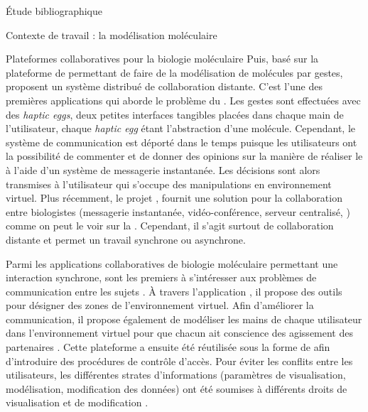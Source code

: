 \documentclass[myfrancais,ngerman,english,frenchb]{mythesis}
\begin{document}
\begin{mychapter}{Étude bibliographique}
\begin{mysection}{Contexte de travail : la modélisation moléculaire}
\begin{mysubsection}{Plateformes collaboratives pour la biologie moléculaire}
				Puis, basé sur la plateforme de  permettant de faire de la modélisation de molécules par gestes,  proposent un système distribué de collaboration distante.
				C'est l'une des premières applications qui aborde le problème du .
				Les gestes sont effectuées avec des \textit{haptic eggs}, deux petites interfaces tangibles placées dans chaque main de l'utilisateur, chaque \textit{haptic egg} étant l'abstraction d'une molécule.
				Cependant, le système de communication est déporté dans le temps puisque les utilisateurs ont la possibilité de commenter et de donner des opinions sur la manière de réaliser le  à l'aide d'un système de messagerie instantanée.
				Les décisions sont alors transmises à l'utilisateur qui s'occupe des manipulations en environnement virtuel.
				Plus récemment, le projet \myeMinerals {}, fournit une solution pour la collaboration entre biologistes (messagerie instantanée, vidéo-conférence, serveur centralisé, \myetc) comme on peut le voir sur la .
				Cependant, il s'agit surtout de collaboration distante et permet un travail synchrone ou asynchrone.

				\begin{myfigure}
				\end{myfigure}

				Parmi les applications collaboratives de biologie moléculaire permettant une interaction synchrone,  sont les premiers à s'intéresser aux problèmes de communication entre les sujets .
				À travers l'application \myAMMPVis, il propose des outils pour désigner des zones de l'environnement virtuel.
				Afin d'améliorer la communication, il propose également de modéliser les mains de chaque utilisateur dans l'environnement virtuel pour que chacun ait conscience des agissement des partenaires .
				Cette plateforme a ensuite été réutilisée sous la forme de \myAMMPEXTN afin d'introduire des procédures de contrôle d'accès.
				Pour éviter les conflits entre les utilisateurs, les différentes strates d'informations (paramètres de visualisation, modélisation, modification des données) ont été soumises à différents droits de visualisation et de modification .


\end{mysubsection}
\end{mysection}
\end{mychapter}
\end{document}
